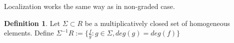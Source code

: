 \documentclass{article}
\theoremstyle{definition}
\theoremstyle{definition}
\newtheorem{definition}{Definition}[theorem]
\theoremstyle{definition}
\theoremstyle{definition}
\theoremstyle{definition}
\theoremstyle{definition}
\theoremstyle{definition}
\begin{document}
Localization works the same way as in non-graded case. 

\begin{tcolorbox}[colback=purple!5!white,colframe=purple!75!black]
\begin{definition}
Let $\Sigma\subset R$ be a multiplicatively closed set of homogeneous elements. Define $\Sigma^{-1}R:=\{\frac{f}{g}: g\in \Sigma, deg(g)=deg(f)\}$
\end{definition}
\end{tcolorbox}
\end{document}
